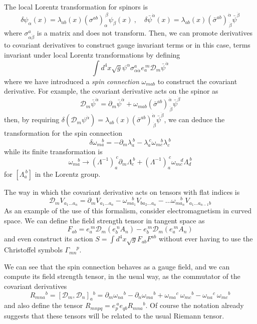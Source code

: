 \documentclass[a4paper,12pt]{article}
\numberwithin{equation}{section}
\numberwithin{exe}{section}
\newcommand{\ph}[1]{\phantom{#1}}
\newcommand{\p}{{\partial}}
\newcommand{\Dc}{{\mathcal D}}
\renewcommand{\a}{{\alpha}}
\newcommand{\ad}{{\dot\alpha}}
\renewcommand{\b}{{\beta}}
\newcommand{\bd}{{\dot\beta}}
\newcommand{\G}{{\Gamma}}
\renewcommand{\d}{{\delta}}
\renewcommand{\l}{{\lambda}}
\renewcommand{\L}{{\Lambda}}
\newcommand{\om}{\omega}
\newcommand{\s}{{\sigma}}
\renewcommand{\sb}{{\bar\sigma}}
\newcommand{\psib}{{\bar\psi}}
\begin{document}
The local Lorentz transformation for spinors is
	\begin{equation}
	\d \psi_\a(x) = \l_{ab}(x) (\s^{ab})_\a^{\ \b} \psi_\b(x)\ ,\quad \d\psib^\ad(x) = \l_{ab}(x)(\sb^{ab})^\ad_{\ \bd} \psib^\bd
	\end{equation}
where $\s^a_{\a\bd}$ is a matrix and does not transform. Then, we can promote derivatives to covariant derivatives to construct gauge invariant terms or in this case, terms invariant under local Lorentz transformations by defining
	\begin{equation}
	\int d^4x \sqrt{g} \psi^\a \s^a_{\a\ad} e_a^{\ m} \Dc_m \psib^\ad
	\end{equation}
where we have introduced a {\it spin connection} $\om_{mab}$ to construct the covariant derivative. For example, the covariant derivative acts on the spinor as
	\begin{equation}
	\Dc_m \psib^\ad = \p_m \psib^\ad + \om_{mab} (\sb^{ab})^\ad_{\ \bd} \psib^\bd
	\end{equation}
then, by requiring $\d (\Dc_m \psi^\ad) = \l_{ab}(x) (\sb^{ab})^\ad_{\ \bd}\psib^\bd$, we can deduce the transformation for the spin connection
	\begin{equation}
	\d \om_{m a}^{\quad b} = -\p_m \l_a^{\ b} - \l_a^{\ c} \om_{mc}^{\quad b} \l_c^{\ b}
	\end{equation}
while its finite transformation is
	\begin{equation}
	\om_{ma}^{\quad b} \rightarrow (\L^{-1})_a^{\ c}\p_m \L_c^{\ b} + (\L^{-1})_a^{\ c} \om_{mc}^{\quad d}\L_d^{\ b}
	\end{equation}
for $[\L_a^{\ b}]$ in the Lorentz group.

The way in which the covariant derivative acts on tensors with flat indices is
	\begin{equation}
	\Dc_m V_{a_1\ldots a_n} = \p_m V_{a_1\ldots a_n} - \om_{ma_1}^{\quad b} V_{b a_2\ldots a_n} -\ldots \om_{ma_n}^{\quad b} V_{a_1\ldots a_{n-1} b}
	\end{equation}
As an example of the use of this formalism, consider electromagnetism in curved space. We can define the field strength tensor in tangent space as
	\begin{equation}
	F_{ab} = e_a^{\ m} \Dc_m (e_b^{\ n} A_n) - e_b^{\ m}\Dc_m(e_a^{\ m} A_n)
	\end{equation}
and even construct its action $S = \int d^4x \sqrt{g} F_{ab}F^{ab}$ without ever having to use the Christoffel symbols $\G_{mn}^{\ph{mn}p}$.

We can see that the spin connection behaves as a gauge field, and we can compute its field strength tensor, in the usual way, as the commutator of the covariant derivatives
	\begin{equation}
	R_{mna}{}^b = [\Dc_m, \Dc_n]_a{}^b = \p_m \om_{na}{}^b - \p_n \om_{ma}{}^b + \om_{ma}{}^c\ \om_{mc}{}^b - \om_{na}{}^c\ \om_{mc}{}^b
	\end{equation}
and also define the tensor $R_{mnpq} = e_p^{\ a} e_{qb} R_{mna}{}^b$. Of course the notation already suggests that these tensors will be related to the usual Riemann tensor.
\end{document}
